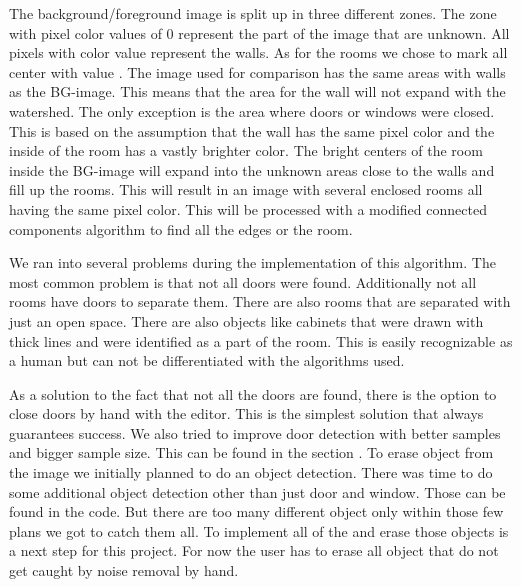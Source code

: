 The background/foreground image is split up in three different zones. The zone with pixel color values of 0 represent the part of the image that are unknown. All pixels with color value  represent the walls. As for the rooms we chose to mark all center with value . The image used for comparison has the same areas with walls as the BG-image. This means that the area for the wall will not expand with the watershed. The only exception is the area where doors or windows were closed. This is based on the assumption that the wall has the same pixel color and the inside of the room has a vastly brighter color.
The bright centers of the room inside the BG-image will expand into the unknown areas close to the walls and fill up the rooms. This will result in an image with several enclosed rooms all having the same pixel color. This will be processed with a modified connected components algorithm to find all the edges or the room.

We ran into several problems during the implementation of this algorithm. The most common problem is that not all doors were found. Additionally not all rooms have doors to separate them. There are also rooms that are separated with just an open space. There are also objects like cabinets that were drawn with thick lines and were identified as a part of the room. This is easily recognizable as a human but can not be differentiated with the algorithms used.

As a solution to the fact that not all the doors are found, there is the option to close doors by hand with the editor. This is the simplest solution that always guarantees success. We also tried to improve door detection with better samples and bigger sample size. This can be found in the section .
To erase object from the image we initially planned to do an object detection. There was time to do some additional object detection other than just door and window. Those can be found in the code. But there are too many different object only within those few plans we got to catch them all. To implement all of the and erase those objects is a next step for this project. For now the user has to erase all object that do not get caught by noise removal by hand.
